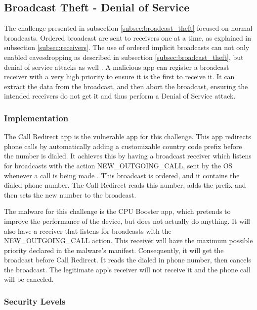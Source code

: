     \subsection{Broadcast Theft - Denial of Service}
        \label{subsec:broadcast_theft_dos}
        
    The challenge presented in subsection \ref{subsec:broadcast_theft} focused on normal broadcasts. Ordered broadcast are sent to receivers one at a time, as explained in subsection \ref{subsec:receivers}. The use of ordered implicit broadcasts can not only enabled eavesdropping as described in subsection \ref{subsec:broadcast_theft}, but denial of service attacks as well \cite{2010_icc_paper}. A malicious app can register a broadcast receiver with a very high priority to ensure it is the first to receive it. It can extract the data from the broadcast, and then abort the broadcast, ensuring the intended receivers do not get it and thus perform a Denial of Service attack.
    
    \subsubsection{Implementation}
        \label{subsubsec:broadcast_theft_dos_implementation}

    The Call Redirect app is the vulnerable app for this challenge. This app redirects phone calls by automatically adding a customizable country code prefix before the number is dialed. It achieves this by having a broadcast receiver which listens for broadcasts with the action NEW\_OUTGOING\_CALL, sent by the OS whenever a call is being made \cite{intents}. This broadcast is ordered, and it contains the dialed phone number. The Call Redirect reads this number, adds the prefix and then sets the new number to the broadcast.
    
    The malware for this challenge is the CPU Booster app, which pretends to improve the performance of the device, but does not actually do anything. It will also have a receiver that listens for broadcasts with the NEW\_OUTGOING\_CALL action. This receiver will have the maximum possible priority declared in the malware's manifest. Consequently, it will get the broadcast before Call Redirect. It reads the dialed in phone number, then cancels the broadcast. The legitimate app's receiver will not receive it and the phone call will be canceled.
    
    \subsubsection{Security Levels}
        \label{subsubsec:broadcast_theft_dos_security_levels}
        

